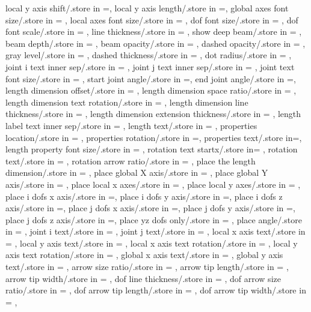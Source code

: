 {local y axis shift/.store in =\localyshift,
local y axis length/.store in =\localylength,
global axes font size/.store in = \globalaxesfontsize,
local axes font size/.store in = \localaxesfontsize,
dof font size/.store in = \doffontsize,
dof font scale/.store in = \doffontscale,
line thickness/.store in = \linethickness,
show deep beam/.store in = \showdeep,
beam depth/.store in = \beamdepth,
beam opacity/.store in = \beamopa,
dashed opacity/.store in = \dashedopa,
gray level/.store in = \graylevel,
dashed thickness/.store in = \dashedthk,
dot radius/.store in = \dotradius,
joint i text inner sep/.store in = \jointinnersepi,
joint j text inner sep/.store in = \jointinnersepj,
joint text font size/.store in = \jointtextfontsize,
start joint angle/.store in =\startjointangle,
end joint angle/.store in =\endjointangle,
length dimension offset/.store in = \lengthdimoffset,
length dimension space ratio/.store in = \lengthdimspaceratio,
length dimension text rotation/.store in = \lengthlabelrotation,
length dimension line thickness/.store in = \lengthdimlinethick,
length dimension extension thickness/.store in = \lengthdimextthick,
length label text inner sep/.store in = \lengthlabeltextinnersep,
length text/.store in = \lengthtext,
properties location/.store in = \propertyloc,
properties rotation/.store in =\propertyrotation,
properties text/.store in=\propertiestext,
length property font size/.store in = \lengthpropfontsize,
rotation text startx/.store in= \rotationanglex,
rotation text/.store in = \rotationtext,
rotation arrow ratio/.store in = \rotationarrowratio,
place the length dimension/.store in = \placelengthdim,
place global X axis/.store in = \placeglobalaxesX,
place global Y axis/.store in = \placeglobalaxesY,
place local x axes/.store in = \placelocalxaxes,
place local y axes/.store in = \placelocalyaxes,
place i dofs x axis/.store in =\placeidofx,
place i dofs y axis/.store in =\placeidofy,
place i dofs z axis/.store in =\placeidofz,
place j dofs x axis/.store in =\placejdofx,
place j dofs y axis/.store in =\placejdofy,
place j dofs z axis/.store in =\placejdofz,
place yz dofs only/.store in = \placeyzdofsonly,
place angle/.store in = \placeangle,
joint i text/.store in = \jointitext,
joint j text/.store in = \jointjtext,
local x axis text/.store in = \localxtext,
local y axis text/.store in = \localytext,
local x axis text rotation/.store in = \localxtextang,
local y axis text rotation/.store in = \localytextang,
global x axis text/.store in = \globalxtext,
global y axis text/.store in = \globalytext,
arrow size ratio/.store in = \arrsizrat,
arrow tip length/.store in = \arrlen,
arrow tip width/.store in = \arrwid,
dof line thickness/.store in = \doflinethickness,
dof arrow size ratio/.store in = \dofarrtipsizrat,
dof arrow tip length/.store in = \dofarrtiplen,
dof arrow tip width/.store in = \dofarrtipwid,}

